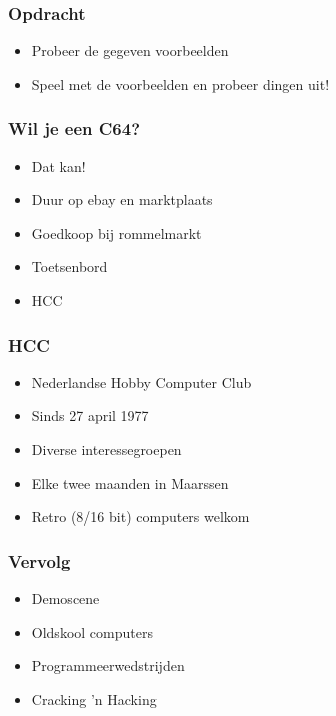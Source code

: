 \documentclass[aspectratio=43]{uva-inf-presentation}
\begin{document}
\begin{frame}
\frametitle{Opdracht}

\begin{itemize}
\item Probeer de gegeven voorbeelden
\item Speel met de voorbeelden en probeer dingen uit!
\end{itemize}

\end{frame}


\begin{frame}
\frametitle{Wil je een C64?}

\begin{itemize}
\item Dat kan!
\item Duur op ebay en marktplaats
\item Goedkoop bij rommelmarkt
\item Toetsenbord
\item HCC
\end{itemize}

\end{frame}


\begin{frame}
\frametitle{HCC}

\begin{itemize}
\item Nederlandse Hobby Computer Club
\item Sinds 27 april 1977
\item Diverse interessegroepen
\item Elke twee maanden in Maarssen
\item Retro (8/16 bit) computers welkom
\end{itemize}

\end{frame}


\begin{frame}
\frametitle{Vervolg}

\begin{itemize}
\item Demoscene
\item Oldskool computers
\item Programmeerwedstrijden
\item Cracking 'n Hacking
\end{itemize}

\end{frame}
\end{document}
